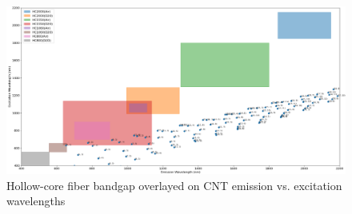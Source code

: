 \begin{figure}[htb!]
	\centering
	\includegraphics[width=\textwidth]{./Figures/CNTs/fibers_cnt.png}
	\caption{ Hollow-core fiber bandgap overlayed on CNT emission vs. excitation wavelengths }
	\label{fig:cntoverlap}
\end{figure}

